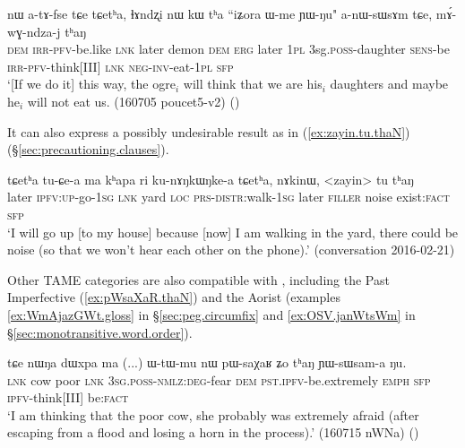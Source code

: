 \begin{exe}
\ex \label{ex:mAwGndzaj.thaN}
\gll  nɯ a-tɤ-fse tɕe tɕetʰa,  ɬɤndʐi nɯ kɯ tʰa ``iʑora ɯ-me ɲɯ-ŋu" a-nɯ-sɯsɤm tɕe, mɤ́-wɣ-ndza-j tʰaŋ \\
\textsc{dem} \textsc{irr}-\textsc{pfv}-be.like \textsc{lnk} later demon \textsc{dem} \textsc{erg} later \textsc{1pl} 3sg.\textsc{poss}-daughter \textsc{sens}-be \textsc{irr}-\textsc{pfv}-think[III] \textsc{lnk} \textsc{neg}-\textsc{inv}-eat-\textsc{1pl} \textsc{sfp} \\
\glt `[If we do it] this way, the ogre$_i$ will think that we are his$_i$ daughters and maybe he$_i$ will not eat us. (160705 poucet5-v2)
()
\end{exe} 

It can also express a possibly undesirable result as in (\ref{ex:zayin.tu.thaN}) (§\ref{sec:precautioning.clauses}).

\begin{exe}
\ex \label{ex:zayin.tu.thaN}
\gll  tɕetʰa tu-ɕe-a ma kʰapa ri ku-nɤŋkɯŋke-a tɕetʰa, nɤkinɯ, <zayin> tu tʰaŋ \\
later \textsc{ipfv}:\textsc{up}-go-\textsc{1sg} \textsc{lnk} yard \textsc{loc} \textsc{prs}-\textsc{distr}:walk-\textsc{1sg}  later \textsc{filler} noise exist:\textsc{fact} \textsc{sfp} \\
\glt `I will go up [to my house] because [now] I am walking in the yard, there could be noise (so that we won't hear each other on the phone).' (conversation 2016-02-21)
\end{exe} 

Other TAME categories are also compatible with , including the Past Imperfective (\ref{ex:pWsaXaR.thaN}) and the Aorist (examples \ref{ex:WmAjazGWt.gloss} in §\ref{sec:peg.circumfix} and \ref{ex:OSV.janWtsWm} in §\ref{sec:monotransitive.word.order}).
 
\begin{exe} 
\ex \label{ex:pWsaXaR.thaN}
\gll tɕe nɯŋa dɯxpa ma  (...) ɯ-tɯ-mu nɯ pɯ-saχaʁ ʑo tʰaŋ ɲɯ-sɯsam-a ŋu. \\
\textsc{lnk} cow poor \textsc{lnk} { } \textsc{3sg}.\textsc{poss}-\textsc{nmlz}:\textsc{deg}-fear \textsc{dem} \textsc{pst}.\textsc{ipfv}-be.extremely \textsc{emph} \textsc{sfp} \textsc{ipfv}-think[III] be:\textsc{fact} \\
\glt  `I am thinking that the poor cow, she probably was extremely afraid (after escaping from a flood and losing a horn in the process).' (160715 nWNa)
()
\end{exe} 

